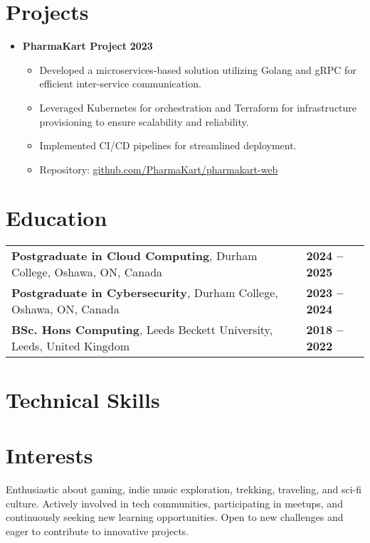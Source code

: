 \documentclass[11pt,a4paper,sans]{moderncv}
\newcommand{\sectionseparator}{\vspace{5pt}\par\noindent\makebox[\linewidth]{\rule{\textwidth}{0.4pt}}\vspace{0pt}}
\begin{document}
\sectionseparator

\section{Projects}
\begin{itemize}[leftmargin=*]
    \item \textbf{PharmaKart Project} \hfill \textbf{2023}
    \begin{itemize}
        \item Developed a microservices-based solution utilizing Golang and gRPC for efficient inter-service communication.
        \item Leveraged Kubernetes for orchestration and Terraform for infrastructure provisioning to ensure scalability and reliability.
        \item Implemented CI/CD pipelines for streamlined deployment.
        \item Repository: \href{https://github.com/PharmaKart/pharmakart-web}{github.com/PharmaKart/pharmakart-web}
    \end{itemize}
\end{itemize}

\sectionseparator

\section{Education}
\begin{tabular}{@{}p{} p{}@{}}
    \textbf{Postgraduate in Cloud Computing}, Durham College, Oshawa, ON, Canada & \hfill \textbf{2024 -- 2025} \\
    \textbf{Postgraduate in Cybersecurity}, Durham College, Oshawa, ON, Canada & \hfill \textbf{2023 -- 2024} \\
    \textbf{BSc. Hons Computing}, Leeds Beckett University, Leeds, United Kingdom & \hfill \textbf{2018 -- 2022} \\
\end{tabular}

\sectionseparator

\section{Technical Skills}

\sectionseparator

\section{Interests}
Enthusiastic about gaming, indie music exploration, trekking, traveling, and sci-fi culture. Actively involved in tech communities, participating in meetups, and continuously seeking new learning opportunities. Open to new challenges and eager to contribute to innovative projects.
\end{document}
